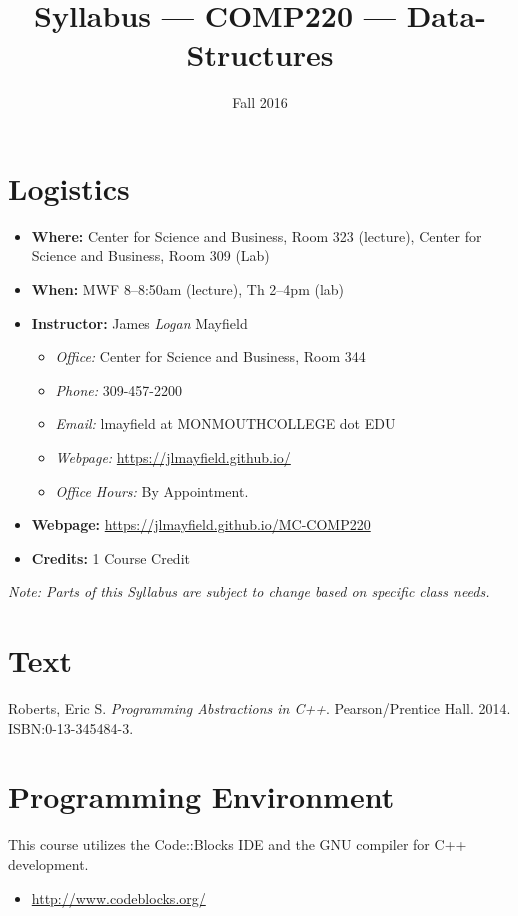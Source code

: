 \documentclass[10pt]{article}
\title{Syllabus --- COMP220 --- Data-Structures}
\author{ }
\date{Fall 2016}
\begin{document}
\maketitle

\section{Logistics}
\begin{itemize}
\item \textbf{Where: } Center for Science and Business, Room 323 (lecture), Center for Science and Business, Room 309 (Lab)
\item \textbf{When: } MWF 8--8:50am (lecture), Th 2--4pm (lab)
\item \textbf{Instructor: } James \textit{Logan} Mayfield
\begin{itemize}
\item \textit{Office: } Center for Science and Business, Room 344
\item \textit{Phone: } 309-457-2200 %
\item \textit{Email: } lmayfield at MONMOUTHCOLLEGE dot EDU
\item \textit{Webpage: } \url{https://jlmayfield.github.io/}
\item \textit{Office Hours: }   By Appointment.
\end{itemize}
\item \textbf{Webpage: } \url{https://jlmayfield.github.io/MC-COMP220}
\item \textbf{Credits: } 1 Course Credit
\end{itemize}
\emph{Note: Parts of this Syllabus are subject to change based on specific class needs.}

\section{Text}
\noindent
Roberts, Eric S\@. \textit{Programming Abstractions in C++}. Pearson/Prentice Hall. 2014. ISBN:0-13-345484-3. %


\section{Programming Environment}

This course utilizes the Code::Blocks IDE and the GNU compiler for C++ development.
\begin{itemize}
\item \url{http://www.codeblocks.org/}
\end{itemize}
\end{document}
